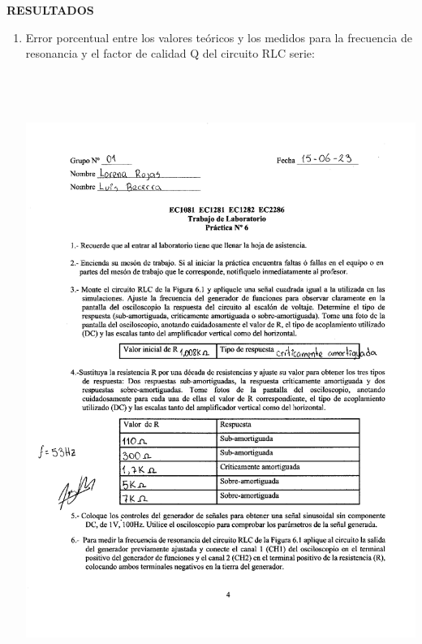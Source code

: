 \documentclass[12pt]{article}
\begin{document}
    \newpage
    
    \begin{center}
    	\textbf{\large RESULTADOS}\\
    \end{center}
    
    \renewcommand{\theenumi}{\alph{enumi}} %
    
    \begin{enumerate}
    	\item Error porcentual entre los valores teóricos y los medidos para la
    	frecuencia de resonancia y el factor de calidad Q del circuito RLC serie:
    	
    	\begin{center}
    		\includegraphics[width=16cm,height=20cm]{Img/prac_0001}
    	\end{center}
    	

\end{enumerate}
\end{document}
